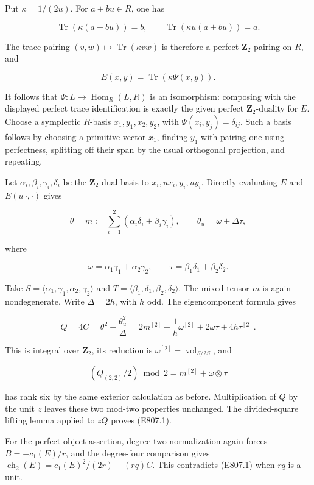 Put \(\kappa=1/(2u)\). For \(a+bu\in R\), one has

\[
 \operatorname{Tr}(\kappa(a+bu))=b,\qquad
 \operatorname{Tr}(\kappa u(a+bu))=a.
\]

The trace pairing \((v,w)\mapsto\operatorname{Tr}(\kappa vw)\) is
therefore a perfect \(\mathbf Z_2\)-pairing on \(R\), and

\[
 E(x,y)=\operatorname{Tr}(\kappa\Psi(x,y)).
\]

It follows that \(\Psi:L\longrightarrow\operatorname{Hom}_R(L,R)\) is an
isomorphism: composing with the displayed perfect trace identification
is exactly the given perfect \(\mathbf Z_2\)-duality for \(E\). Choose a
symplectic \(R\)-basis \(x_1,y_1,x_2,y_2\), with
\(\Psi(x_i,y_j)=\delta_{ij}\). Such a basis follows by choosing a
primitive vector \(x_1\), finding \(y_1\) with pairing one using
perfectness, splitting off their span by the usual orthogonal
projection, and repeating.

Let \(\alpha_i,\beta_i,\gamma_i,\delta_i\) be the \(\mathbf Z_2\)-dual
basis to \(x_i,ux_i,y_i,uy_i\). Directly evaluating \(E\) and
\(E(u\,\cdot,\cdot)\) gives

\[
 \theta=m:=\sum_{i=1}^2(\alpha_i\delta_i+\beta_i\gamma_i),
 \qquad
 \theta_u=\omega+\Delta\tau,
 \tag{E807.4}
\]

where

\[
 \omega=\alpha_1\gamma_1+\alpha_2\gamma_2,\qquad
 \tau=\beta_1\delta_1+\beta_2\delta_2.
\]

Take \(S=\langle\alpha_1,\gamma_1,\alpha_2,\gamma_2\rangle\) and
\(T=\langle\beta_1,\delta_1,\beta_2,\delta_2\rangle\). The mixed tensor
\(m\) is again nondegenerate. Write \(\Delta=2h\), with \(h\) odd. The
eigencomponent formula gives

\[
 Q=4C=\theta^2+\frac{\theta_u^2}{\Delta}
   =2m^{[2]}+\frac1h\omega^{[2]}
          +2\omega\tau+4h\tau^{[2]}.
 \tag{E807.5}
\]

This is integral over \(\mathbf Z_2\), its reduction is
\(\omega^{[2]}=\operatorname{vol}_{S/2S}\), and

\[
 (Q_{(2,2)}/2)\bmod2=m^{[2]}+\omega\otimes\tau
\]

has rank six by the same exterior calculation as before. Multiplication
of \(Q\) by the unit \(z\) leaves these two mod-two properties
unchanged. The divided-square lifting lemma applied to \(zQ\) proves
(E807.1).

For the perfect-object assertion, degree-two normalization again forces
\(B=-c_1(E)/r\), and the degree-four comparison gives
\(\operatorname{ch}_2(E)=c_1(E)^2/(2r)-(rq)C\). This contradicts
(E807.1) when \(rq\) is a unit.


